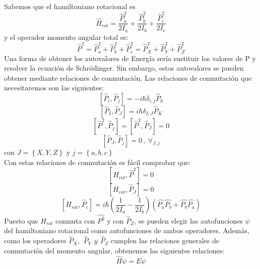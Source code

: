 \documentclass[a4paper]{article}
\begin{document}
Sabemos que el hamiltoniano rotacional es
\begin{equation}
\hat H_{rot}=\frac{\hat P_a^2}{2I_a}+\frac{\hat P_b^2}{2I_b}+\frac{\hat P_c^2}{2I_c}
\end{equation}
y el operador momento angular total es:
\begin{equation}
\hat P^2 = \hat P_a^2+  \hat P_b^2+  \hat P_c^2 = \hat P_X^2+  \hat P_Y^2+  \hat P_Z^2
\end{equation}
Una forma de obtener los autovalores de Energía sería sustituir los valores de P y resolver la ecuación de Schrödinger. Sin embargo, estos autovalores se pueden obtener mediante relaciones de conmutación.
Las relaciones de conmutación que necesitaremos son las siguientes:
\begin{equation}
\left[\hat P_i,\hat P_j\right]=-i\hbar\delta_{i,j}\hat P_k
\end{equation}
\begin{equation}
\left[\hat P_I,\hat P_J\right]=i\hbar\delta_{I,J}\hat P_K
\end{equation}
\begin{equation}
\left[\hat P^2,\hat P_j\right]=\left[\hat P^2,\hat P_J\right]=0
\end{equation}
\begin{equation}
\left[\hat P_J,\hat P_j\right]=0 \,,\ \forall_{J,j}
\end{equation}
con $J = \left\lbrace X,Y,Z \right\rbrace$ y $j= \left\lbrace a,b,c \right\rbrace$ \\
Con estas relaciones de conmutación es fácil comprobar que:
\begin{equation}
\left[H_{rot}, \hat P^2 \right] = 0
\end{equation}
\begin{equation}
\left[H_{rot}, \hat P_J \right] = 0
\end{equation}
\begin{equation}
\left[H_{rot}, \hat P_c \right] = i\hbar \left(\frac{1}{2I_a}-\frac{1}{2I_b}\right)\left(\hat{P_a}\hat{P_b}+\hat{P_b}\hat{P_a}\right)
\end{equation}
Puesto que $H_{rot}$ conmuta con $\hat{P^2}$ y con $\hat P_Z$,  se pueden elegir las autofunciones $\psi$ del hamiltoniano rotacional como autofunciones de ambos operadores. Además, como los operadores $\hat P_X, \,\ \hat P_Y \,\ y \,\ \hat P_Z$ cumplen las relaciones generales de conmutación del momento angular, obtenemos las siguientes relaciones:
\begin{equation}
\hat H\psi = E\psi
\end{equation}
\end{document}
